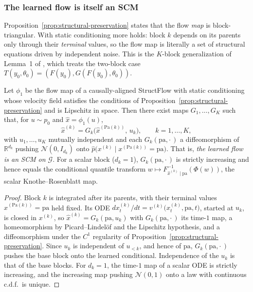 \subsubsection{The learned flow is itself an SCM}

Proposition~\ref{prop:structural-preservation} states that the flow \emph{map} is
block-triangular. With static conditioning more holds: block $k$ depends on its parents only
through their \emph{terminal} values, so the flow map is literally a set of structural
equations driven by independent noise. This is the $K$-block generalization of Lemma~1 of
\citet{jeong_conditional_2025}, which treats the two-block case
$T(y_0,\theta_0) = (F(y_0), G(F(y_0),\theta_0))$.

\begin{lemma}
\label{lem:mech}
Let $\phi_1$ be the flow map of a causally-aligned StructFlow with static conditioning whose
velocity field satisfies the conditions of Proposition~\ref{prop:structural-preservation}
and is Lipschitz in space. Then there exist maps $G_1,\dots,G_K$ such that, for
$u \sim p_0$ and $\hat x = \phi_1(u)$,
\begin{equation}
\label{eq:learned-scm}
  \hat x^{(k)} = G_k\bigl(\hat x^{(\mathrm{Pa}(k))},\, u_k\bigr),
  \qquad k = 1,\dots,K,
\end{equation}
with $u_1,\dots,u_K$ mutually independent and each $G_k(\mathrm{pa}, \cdot\,)$ a
diffeomorphism of $\mathbb{R}^{d_k}$ pushing $\mathcal{N}(0, I_{d_k})$ onto
$\hat p\bigl(x^{(k)} \mid x^{(\mathrm{Pa}(k))} = \mathrm{pa}\bigr)$. That is, \emph{the
learned flow is an SCM on $\mathcal{G}$}. For a scalar block ($d_k = 1$), $G_k(\mathrm{pa},
\cdot\,)$ is strictly increasing and hence equals the conditional quantile transform
$w \mapsto F^{-1}_{\hat x^{(k)} \mid \mathrm{pa}}(\Phi(w))$, the scalar Knothe--Rosenblatt
map.
\end{lemma}

\begin{proof}
Block $k$ is integrated after its parents, with their terminal values
$\hat x^{(\mathrm{Pa}(k))} = \mathrm{pa}$ held fixed. Its ODE
$dx^{(k)}_t/dt = v^{(k)}\bigl(x^{(k)}_t, \mathrm{pa}, t\bigr)$, started at $u_k$, is closed
in $x^{(k)}$, so $\hat x^{(k)} = G_k(\mathrm{pa}, u_k)$ with $G_k(\mathrm{pa},\cdot\,)$ its
time-$1$ map, a homeomorphism by Picard--Lindel\"of and the Lipschitz hypothesis, and a
diffeomorphism under the $C^1$ regularity of Proposition~\ref{prop:structural-preservation}. Since
$u_k$ is independent of $u_{<k}$, and hence of $\mathrm{pa}$, $G_k(\mathrm{pa},\cdot\,)$
pushes the base block onto the learned conditional. Independence of the $u_k$ is that of
the base blocks. For $d_k = 1$, the time-$1$ map of a scalar ODE is strictly increasing,
and the increasing map pushing $\mathcal{N}(0,1)$ onto a law with continuous c.d.f.\ is
unique.
\end{proof}

